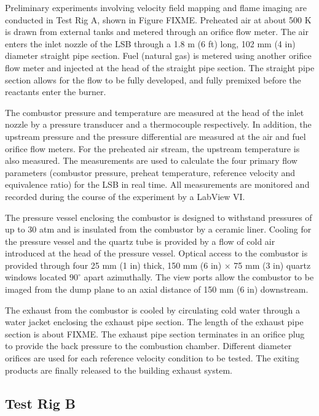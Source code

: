 Preliminary experiments involving velocity field mapping and flame imaging are conducted in Test Rig A, shown in Figure FIXME.
Preheated air at about 500 K is drawn from external tanks and metered through an orifice flow meter.
The air enters the inlet nozzle of the LSB through a 1.8 m (6 ft) long, 102 mm (4 in) diameter straight pipe section.
Fuel (natural gas) is metered using another orifice flow meter and injected at the head of the straight pipe section.
The straight pipe section allows for the flow to be fully developed, and fully premixed before the reactants enter the burner.

The combustor pressure and temperature are measured at the head of the inlet nozzle by a pressure transducer and a thermocouple respectively.
In addition, the upstream pressure and the pressure differential are measured at the air and fuel orifice flow meters.
For the preheated air stream, the upstream temperature is also measured.
The measurements are used to calculate the four primary flow parameters (combustor pressure, preheat temperature, reference velocity and equivalence ratio) for the LSB in real time.
All measurements are monitored and recorded during the course of the experiment by a LabView VI.

The pressure vessel enclosing the combustor is designed to withstand pressures of up to 30 atm and is insulated from the combustor by a ceramic liner.
Cooling for the pressure vessel and the quartz tube is provided by a flow of cold air introduced at the head of the pressure vessel.
Optical access to the combustor is provided through four 25 mm (1 in) thick, 150 mm (6 in) \(\times\) 75 mm (3 in) quartz windows located \(90^\circ\) apart azimuthally.
The view ports allow the combustor to be imaged from the dump plane to an axial distance of 150 mm (6 in) downstream.

The exhaust from the combustor is cooled by circulating cold water through a water jacket enclosing the exhaust pipe section.
The length of the exhaust pipe section is about FIXME.
The exhaust pipe section terminates in an orifice plug to provide the back pressure to the combustion chamber.
Different diameter orifices are used for each reference velocity condition to be tested.
The exiting products are finally released to the building exhaust system.

\subsection{Test Rig B}

